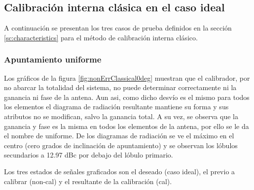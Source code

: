 \subsection{Calibración interna clásica en el caso ideal}

A continuación se presentan los tres casos de prueba definidos en la sección \ref{sc:characteristics} para el método de
calibración interna clásico.

\subsubsection{Apuntamiento uniforme}

Los gráficos de la figura \ref{fig:nonErrClassical0deg} muestran que el calibrador, por no abarcar la totalidad del sistema, no 
puede determinar correctamente ni la ganancia ni fase de la antena. Aun asi, como dicho desvío es el mismo para todos los
elementos el diagrama de radiación resultante mantiene su forma y sus atributos no se modifican, salvo la ganancia total. A su
vez, se observa que la ganancia y fase es la misma en todos los elementos de la antena, por ello se le da el nombre de uniforme.
De los diagramas de radiación se ve el máximo en el centro (cero grados de inclinación de apuntamiento) y se observan los
lóbulos secundarios a 12.97 dBc por debajo del lóbulo primario.

Los tres estados de señales graficados son el deseado (caso ideal), el previo a calibrar (non-cal) y el resultante de la
calibración (cal).

